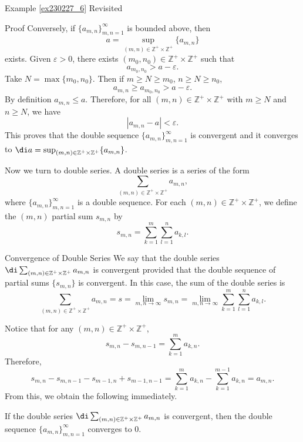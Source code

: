 \begin{example}{\linkt Example \ref{ex230227_6} Revisited}
\begin{example}[label=ex230227_13]{}
\begin{example}{}
\begin{myproof}{Proof}
Conversely, if $\{a_{m,n}\}_{m,n=1}^{\infty}$ is bounded above, then 
\[a=\sup_{(m,n)\in\mathbb{Z}^+\times\mathbb{Z}^+}\{a_{m,n}\}\]  exists. Given $\varepsilon>0$, there exists $(m_0, n_0)\in\mathbb{Z}^+\times \mathbb{Z}^+$ such that 
\[a_{m_0,n_0}>a-\varepsilon.\]
 Take $N=\max\{m_0,n_0\}$. Then if $m\geq N\geq m_0$, $n\geq N\geq n_0$,
\[a_{m,n}\geq   a_{m_0,n_0}> a-\varepsilon.\]
By definition $a_{m,n}\leq a$. Therefore, for all $(m,n)\in\mathbb{Z}^+\times\mathbb{Z}^+$ with $m\geq N$ and $n\geq N$, we have
\[|a_{m,n}-a|<\varepsilon.\]This proves that the double sequence $\{a_{m,n}\}_{m,n=1}^{\infty}$ is convergent and it converges to $\di a=\sup_{(m,n)\in\mathbb{Z}^+\times\mathbb{Z}^+}\{a_{m,n}\}$.
\end{myproof}

Now we turn to double series. A double series is a series of the form
\[\sum_{(m,n)\in\mathbb{Z}^+\times\mathbb{Z}^+}a_{m,n},\]where  $\{a_{m,n}\}_{m,n=1}^{\infty}$  is a double sequence. For each $(m,n)\in \mathbb{Z}^+\times\mathbb{Z}^+$, we define the $(m,n)$ partial sum $s_{m,n}$ by
\[s_{m,n}=\sum_{k=1}^m\sum_{l=1}^na_{k,l}.\]

\begin{definition}{Convergence of Double Series}
We say that the double series $\di\sum_{(m,n)\in\mathbb{Z}^+\times\mathbb{Z}^+}a_{m,n}$ is convergent provided that the double sequence of partial sums $\{s_{m,n}\}$ is convergent. In this case, the sum of the double series is
\[\sum_{(m,n)\in\mathbb{Z}^+\times\mathbb{Z}^+}a_{m,n}=s=\lim_{m,n\to\infty}s_{m,n}=\lim_{m,n\to\infty}\sum_{k=1}^m\sum_{l=1}^na_{k,l}.\]
\end{definition}

Notice that for any $(m,n)\in\mathbb{Z}^+\times \mathbb{Z}^+$,
\[s_{m,n}-s_{m,n-1}=\sum_{k=1}^m a_{k,n}.\]
Therefore,
\[s_{m,n}-s_{m,n-1}-s_{m-1,n}+s_{m-1, n-1}=\sum_{k=1}^ma_{k,n}-\sum_{k=1}^{m-1}a_{k,n}=a_{m,n}.\]
From this, we obtain the following immediately.

\begin{proposition}{}
If the double series $\di \sum_{(m,n)\in\mathbb{Z}^+\times\mathbb{Z}^+}a_{m,n}$ is convergent, then the double sequence   $\{a_{m,n}\}_{m,n=1}^{\infty}$  converges to 0.
\end{proposition}
 

\end{example}
\end{example}
\end{example}

